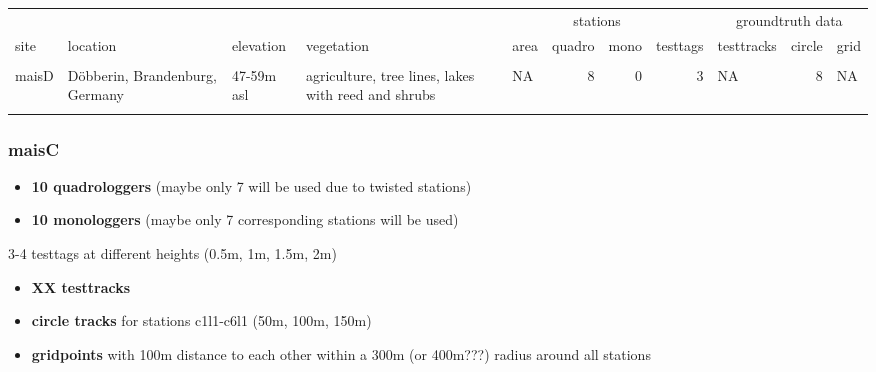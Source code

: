 \documentclass[
]{article}
\providecommand{\tightlist}{%
  \setlength{\itemsep}{0pt}\setlength{\parskip}{0pt}}\usepackage{longtable,booktabs,array}
\begin{document}
\begin{table}
\centering\begingroup\fontsize{10}{12}\selectfont

\begin{tabular}{lllllrrrlrl}
\toprule
\multicolumn{5}{c}{ } & \multicolumn{2}{c}{stations} & \multicolumn{1}{c}{ } & \multicolumn{3}{c}{groundtruth data} \\
\cmidrule(l{3pt}r{3pt}){6-7} \cmidrule(l{3pt}r{3pt}){9-11}
site & location & elevation & vegetation & area & quadro & mono & testtags & testtracks & circle & grid\\
\midrule
\cellcolor{gray!6}{maisC} & \cellcolor{gray!6}{Vierlinden, Brandenburg, Germany} & \cellcolor{gray!6}{5-7m asl} & \cellcolor{gray!6}{agriculture, tree lines, ditches with reed} & \cellcolor{gray!6}{NA} & \cellcolor{gray!6}{10} & \cellcolor{gray!6}{10} & \cellcolor{gray!6}{4} & \cellcolor{gray!6}{NA} & \cellcolor{gray!6}{8} & \cellcolor{gray!6}{NA}\\
maisD & Döbberin, Brandenburg, Germany & 47-59m asl & agriculture, tree lines, lakes with reed and shrubs & NA & 8 & 0 & 3 & NA & 8 & NA\\
\cellcolor{gray!6}{melons} & \cellcolor{gray!6}{NA} & \cellcolor{gray!6}{NA} & \cellcolor{gray!6}{NA} & \cellcolor{gray!6}{NA} & \cellcolor{gray!6}{NA} & \cellcolor{gray!6}{0} & \cellcolor{gray!6}{NA} & \cellcolor{gray!6}{NA} & \cellcolor{gray!6}{NA} & \cellcolor{gray!6}{NA}\\
\bottomrule
\end{tabular}
\endgroup{}
\end{table}

\hypertarget{maisc}{%
\subsubsection{maisC}\label{maisc}}

\begin{itemize}
\tightlist
\item
  \textbf{10 quadrologgers} (maybe only 7 will be used due to twisted
  stations)\\
\item
  \textbf{10 monologgers} (maybe only 7 corresponding stations will be
  used)
\end{itemize}

3-4 testtags at different heights (0.5m, 1m, 1.5m, 2m)

\begin{itemize}
\tightlist
\item
  \textbf{XX testtracks}\\
\item
  \textbf{circle tracks} for stations c1l1-c6l1 (50m, 100m, 150m)\\
\item
  \textbf{gridpoints} with 100m distance to each other within a 300m (or
  400m???) radius around all stations
\end{itemize}
\end{document}
